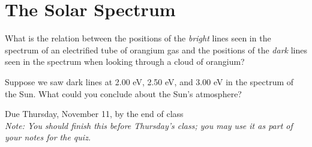 \documentclass[11pt]{article}
\begin{document}
\section{The Solar Spectrum}

What is the relation between the positions of the {\it bright} lines seen in the spectrum of an electrified tube of orangium gas and the positions of the {\it dark} lines seen in the spectrum when looking through a cloud of orangium?

\vspace{0.5in}

Suppose we saw dark lines at 2.00 eV, 2.50 eV, and 3.00 eV in the spectrum of the Sun. What could you conclude about the Sun's atmosphere?


\newpage

\centerline{}
	
	\normalsize
	\begin{center}
		Due Thursday, November 11, by the end of class\\
		\small \it Note: You should finish this before Thursday's class; you may use it as part of your notes for the quiz.
	\end{center}
	
	\bigskip
	
\end{document}

